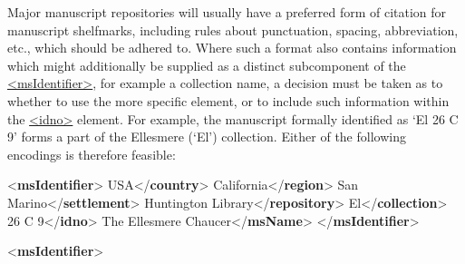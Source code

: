 Major manuscript repositories will usually have a preferred form of citation for manuscript shelfmarks, including rules about punctuation, spacing, abbreviation, etc., which should be adhered to. Where such a format also contains information which might additionally be supplied as a distinct subcomponent of the \hyperref[TEI.msIdentifier]{<msIdentifier>}, for example a collection name, a decision must be taken as to whether to use the more specific element, or to include such information within the \hyperref[TEI.idno]{<idno>} element. For example, the manuscript formally identified as ‘El 26 C 9’ forms a part of the Ellesmere (‘El’) collection. Either of the following encodings is therefore feasible: \par\bgroup{}\exampleFont \begin{shaded}\noindent\mbox{}{<\textbf{msIdentifier}>}\mbox{}\newline 
{}USA{</\textbf{country}>}\mbox{}\newline 
{}California{</\textbf{region}>}\mbox{}\newline 
{}San Marino{</\textbf{settlement}>}\mbox{}\newline 
{}Huntington Library{</\textbf{repository}>}\mbox{}\newline 
{}El{</\textbf{collection}>}\mbox{}\newline 
{}26 C 9{</\textbf{idno}>}\mbox{}\newline 
{}The Ellesmere Chaucer{</\textbf{msName}>}\mbox{}\newline 
{</\textbf{msIdentifier}>}\end{shaded}\egroup\par \noindent  \par\bgroup{}\exampleFont \begin{shaded}\noindent\mbox{}{<\textbf{msIdentifier}>}\mbox{}\newline 

\end{shaded}
